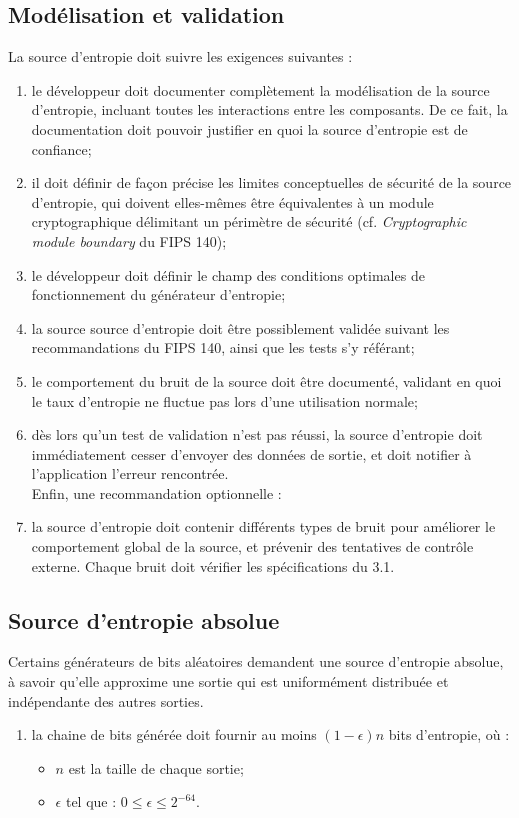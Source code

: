 \subsection{Modélisation et validation}
La source d'entropie doit suivre les exigences suivantes :
\begin{enumerate}
\item le développeur doit documenter complètement la modélisation de la source d'entropie, incluant toutes les interactions entre les composants. De ce fait, la documentation doit pouvoir justifier en quoi la source d'entropie est de confiance; 
\item il doit définir de façon précise les limites conceptuelles de sécurité de la source d'entropie, qui doivent elles-mêmes être équivalentes à un module cryptographique délimitant un périmètre de sécurité (cf. \textit{Cryptographic module boundary} du FIPS 140);
\item le développeur doit définir le champ des conditions optimales de fonctionnement du générateur d'entropie;
\item la source source d'entropie doit être possiblement validée suivant les recommandations du FIPS 140, ainsi que les tests s'y référant;
\item le comportement du bruit de la source doit être documenté, validant en quoi le taux d'entropie ne fluctue pas lors d'une utilisation normale;
\item dès lors qu'un test de validation n'est pas réussi, la source d'entropie doit immédiatement cesser d'envoyer des données de sortie, et doit notifier à l'application l'erreur rencontrée.\\

Enfin, une recommandation optionnelle : 
\item la source d'entropie doit contenir différents types de bruit pour améliorer le comportement global de la source, et prévenir des tentatives de contrôle externe. Chaque bruit doit vérifier les spécifications du 3.1. 
\end{enumerate}

\subsection{Source d'entropie absolue}
Certains générateurs de bits aléatoires demandent une source d'entropie absolue, à savoir qu'elle approxime une sortie qui est uniformément distribuée et indépendante des autres sorties. 
\begin{enumerate}
\item la chaine de bits générée doit fournir au moins $(1-\epsilon)n$ bits d'entropie, où : 
	\begin{itemize}
	\item $n$ est la taille de chaque sortie;
	\item $\epsilon$ tel que : $0\leqslant \epsilon \leqslant 2^{-64}$.\\
	\end{itemize}
\end{enumerate}

